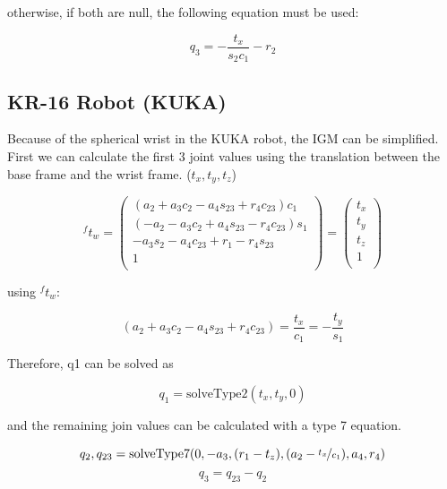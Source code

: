 \documentclass[11pt, oneside]{article}   	%
\begin{document}
otherwise, if both are null, the following equation must be used:

\begin{equation}
q_3 = -\frac{t_x}{s_2 c_1}-r_2
\end{equation}

\subsection{KR-16 Robot (KUKA)}

Because of the spherical wrist in the KUKA robot, the IGM can be simplified. First we can calculate the first 3 joint values using the translation between the base frame and the wrist frame. ($t_x,t_y,t_z$)

\begin{equation*}
^{f}t_w = 
\begin{pmatrix}
(a_2 + a_3 c_2 - a_4 s_{23} + r_4 c_{23}) c_1 \\
(-a_2 -a_3 c_2 + a_4 s_{23} -r_4 c_{23}) s_1 \\
-a_3 s_2 - a_4 c_{23} + r_1 - r_4 s_{23}   \\
 1\\
\end{pmatrix}
=
\begin{pmatrix}
t_x\\
t_y\\
t_z\\
1\\
\end{pmatrix}
\end{equation*}



using ${}^ft_w$:

\begin{equation*}
(a_2 + a_3 c_2 - a_4 s_{23} + r_4 c_{23}) = \frac{t_x}{c_1} = -\frac{t_y}{s_1}
\end{equation*}

Therefore, q1 can be solved as

\begin{equation}
q_1 = \text{solveType2}(t_x,t_y,0)
\end{equation}

and the remaining join values can be calculated with a type 7 equation.

\begin{equation}
q_2,q_{23} = \text{solveType7}(0,-a_3,(r_1 - t_z) , (a_2 - \nicefrac{t_x}{c_1}), a_4, r_4)
\end{equation}
\begin{equation}
q_3 = q_{23} - q_2
\end{equation}
\end{document}
